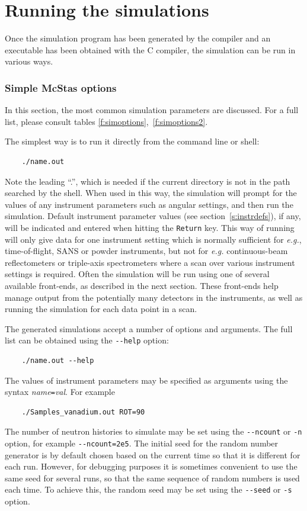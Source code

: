 \section{Running the simulations}
\label{s:run-sim}

Once the simulation program has been generated by the \MCS compiler
and an executable has been obtained with the C compiler, the simulation
can be run in various ways.

\subsubsection{Simple McStas options}
In this section, the most common simulation parameters are
discussed. For a full list, please consult tables
\ref{f:simoptions},~\ref{f:simoptions2}.

The simplest way is to run it directly from the
command line or shell:
\begin{lstlisting}
    ./name.out
\end{lstlisting}
Note the leading ``.'', which is needed if the current directory is not in the
path searched by the shell. When used in this way, the simulation will prompt
for the values of any instrument parameters such as angular settings, and then
run the simulation. Default instrument parameter values (see
section~\ref{s:instrdefs}), if any, will be indicated and entered when hitting
the \verb+Return+ key. This way of
running \MCS will only give data for one instrument setting which is normally
sufficient for {\em e.g.}, time-of-flight, SANS or powder instruments, but not
for {\em e.g.} continuous-beam reflectometers or triple-axis spectrometers where
a scan over various instrument settings is required.  Often the simulation will
be run using one of several available front-ends, as described in the next
section. These front-ends help manage output from the potentially many detectors
in the instruments, as well as running the simulation for each data point in a
scan.

The generated simulations accept a number of options and arguments. The
full list can be obtained using the \verb+--help+ option:
\begin{lstlisting}
    ./name.out --help
\end{lstlisting}
The values of instrument parameters may be specified as arguments using
the syntax \textit{name}\verb+=+\textit{val}. For example
\begin{lstlisting}
    ./Samples_vanadium.out ROT=90
\end{lstlisting}
The number of neutron histories to simulate may be set using the
\verb+--ncount+ or \verb+-n+ option, for example
\verb+--ncount=2e5+. The initial seed for the random number generator is
by default chosen based on the current time so that it is different for
each run. However, for debugging purposes it is sometimes convenient to
use the same seed for several runs, so that the same sequence of random
numbers is used each time. To achieve this, the random seed may be set
using the \verb+--seed+ or \verb+-s+ option.

